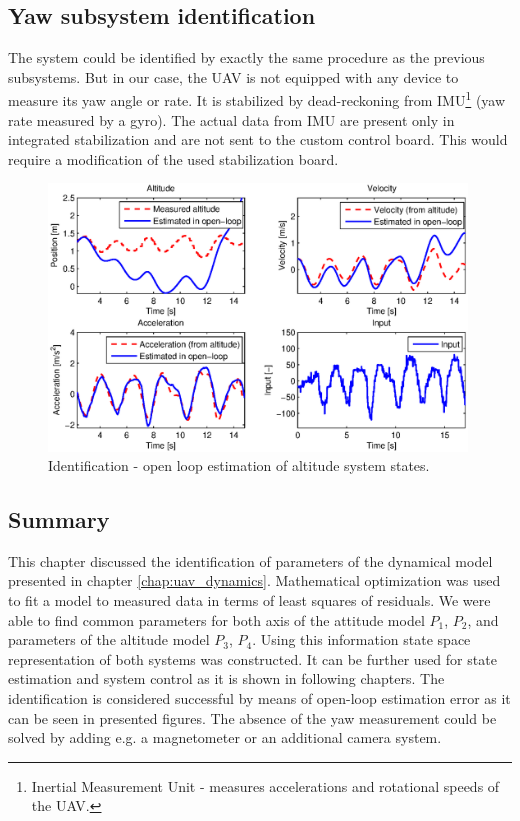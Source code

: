 \subsection{Yaw subsystem identification}

The system could be identified by exactly the same procedure as the previous subsystems. But in our case, the UAV is not equipped with any device to measure its yaw angle or rate. It is stabilized by dead-reckoning from IMU\footnote{Inertial Measurement Unit - measures accelerations and rotational speeds of the UAV.} (yaw rate measured by a gyro). The actual data from IMU are present only in integrated stabilization and are not sent to the custom control board. This would require a modification of the used stabilization board.

\begin{figure}[h]
\includegraphics[width=0.99\textwidth]{fig/iden4.eps} 
\caption{Identification - open loop estimation of altitude system states.}
\label{fig:iden4}
\end{figure}

\subsection{Summary}

This chapter discussed the identification of parameters of the dynamical model presented in chapter \ref{chap:uav_dynamics}. Mathematical optimization was used to fit a model to measured data in terms of least squares of residuals. We were able to find common parameters for both axis of the attitude model $P_1$, $P_2$, and parameters of the altitude model $P_3$, $P_4$. Using this information state space representation of both systems was constructed. It can be further used for state estimation and system control as it is shown in following chapters. The identification is considered successful by means of open-loop estimation error as it can be seen in presented figures. The absence of the yaw measurement could be solved by adding e.g. a magnetometer or an additional camera system.